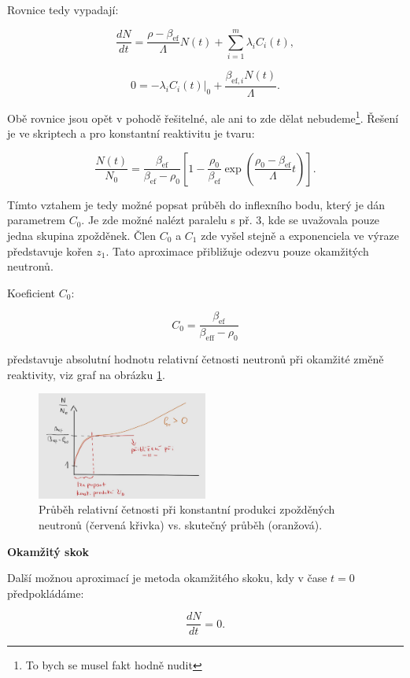 Rovnice tedy vypadají:

$$ \dfrac{dN}{dt} = \dfrac{\rho - \beta_{\text{ef}}}{\Lambda} N(t) + \sum_{i=1}^m \lambda_i C_i(t), $$

$$ 0 = -\lambda_i C_i(t) |_{0} + \dfrac{\beta_{\text{ef},i}  N(t)}{\Lambda}. $$

Obě rovnice jsou opět v pohodě řešitelné, ale ani to zde dělat nebudeme\footnote{To bych se musel fakt hodně nudit}. Řešení je ve skriptech a pro konstantní reaktivitu je tvaru:

$$ \dfrac{N(t)}{N_0} = \dfrac{\beta_{\text{ef}}}{\beta_{\text{ef}}-\rho_0} \left [ 1 - \dfrac{\rho_0}{\beta_{\text{ef}}} \exp{ \left ( \dfrac{\rho_0 - \beta_{\text{ef}}}{\Lambda}t \right ) } \right ]. $$

Tímto vztahem je tedy možné popsat průběh do inflexního bodu, který je dán parametrem $C_0$. Je zde možné nalézt paralelu s př. 3, kde se uvažovala pouze jedna skupina zpožděnek. Člen $C_0$ a $C_1$ zde vyšel stejně a exponenciela ve výraze představuje kořen $z_1$. Tato aproximace přibližuje odezvu pouze okamžitých neutronů.

Koeficient $C_0$:

$$ C_0 = \dfrac{\beta_{\text{ef}}}{\beta_{\text{eff}} - \rho_0} $$

představuje absolutní hodnotu relativní četnosti neutronů při okamžité změně reaktivity, viz graf na obrázku \ref{fig_konstantni_produkce}.

\begin{figure}[H]
  \centering
  \includegraphics[width=0.5\textwidth]{img/konstantni_produkce.jpg}
  \caption{Průběh relativní četnosti při konstantní produkci zpožděných neutronů (červená křivka) vs. skutečný průběh (oranžová).}
  \label{fig_konstantni_produkce}
\end{figure}

\textbf{Okamžitý skok}

Další možnou aproximací je metoda okamžitého skoku, kdy v čase $t = 0$ předpokládáme:

$$ \dfrac{dN}{dt} = 0. $$


